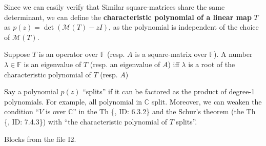\documentclass{article}
\begin{document}
\begin{Rmk}{}
    \begin{compactenum}
        \item Since we can easily verify that \textcolor{Th}{Similar square-matrices share the same determinant}, \textcolor{Df}{we can define the \textbf{characteristic polynomial of a linear map} $T$ as $p(z) = \det (\mathcal{M}(T)-zI)$}, as the polynomial is independent of the choice of $\mathcal{M}(T)$.
        \item \textcolor{Th}{Suppose $T$ is an operator over $\mathbb{F}$ (resp. $A$ is a square-matrix over $\mathbb{F}$). A number $\lambda\in\mathbb{F}$ is an eigenvalue of $T$ (resp. an eigenvalue of $A$) iff $\lambda$ is a root of the characteristic polynomial of $T$ (resp. $A$)}
        \item \textcolor{Df}{Say a polynomial $p(z)$ ``splits'' if it can be factored as the product of degree-1 polynomials.} For example, \textcolor{Th}{all polynomial in $\mathbb{C}$ split.} Moreover, \textcolor{Th}{we can weaken the condition ``$V$ is over $\mathbb{C}$'' in the Th \{, ID: 6.3.2\} and the Schur's theorem (the Th \{, ID: 7.4.3\}) with ``the characteristic polynomial of $T$ splits''.}
    \end{compactenum}
\end{Rmk}

\begin{Th}{Blocks from the file I2.}
\end{Th}
\end{document}
